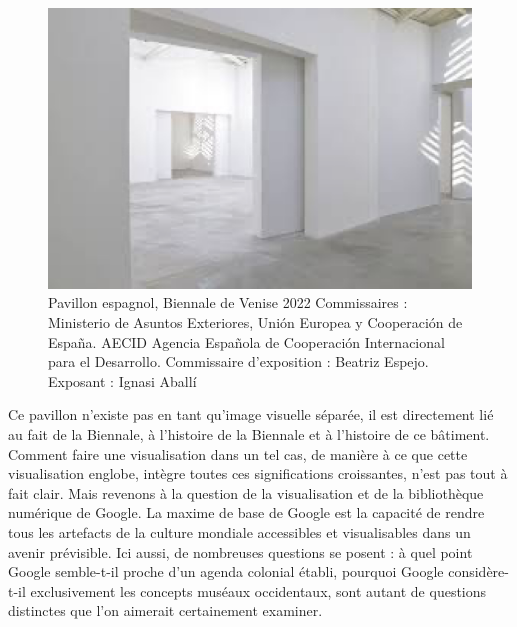 \documentclass[a4paper, twoside, 12pt]{book}
\begin{document}
\begin{figure}
    \centering
    \includegraphics[width=1\linewidth]{esp 2.png}
    \caption{Pavillon espagnol, Biennale de Venise 2022
Commissaires : Ministerio de Asuntos Exteriores, Unión Europea y Cooperación de España. AECID Agencia Española de Cooperación Internacional para el Desarrollo. Commissaire d'exposition : Beatriz Espejo. Exposant : Ignasi Aballí}
    \label{fig:enter-label}
\end{figure}

Ce pavillon n'existe pas en tant qu'image visuelle séparée, il est directement lié au fait de la Biennale, à l'histoire de la Biennale et à l'histoire de ce bâtiment. Comment faire une visualisation dans un tel cas, de manière à ce que cette visualisation englobe, intègre toutes ces significations croissantes, n'est pas tout à fait clair. Mais revenons à la question de la visualisation et de la bibliothèque numérique de Google. La maxime de base de Google est la capacité de rendre tous les artefacts de la culture mondiale accessibles et visualisables dans un avenir prévisible\cite{Pifsterer, U. (2018) Big Bang Art History, International Journal for Digital Art History, no. 3 (juillet)}. Ici aussi, de nombreuses questions se posent : à quel point Google semble-t-il proche d'un agenda colonial établi, pourquoi Google considère-t-il exclusivement les concepts muséaux occidentaux, sont autant de questions distinctes que l'on aimerait certainement examiner. \\
\end{document}
